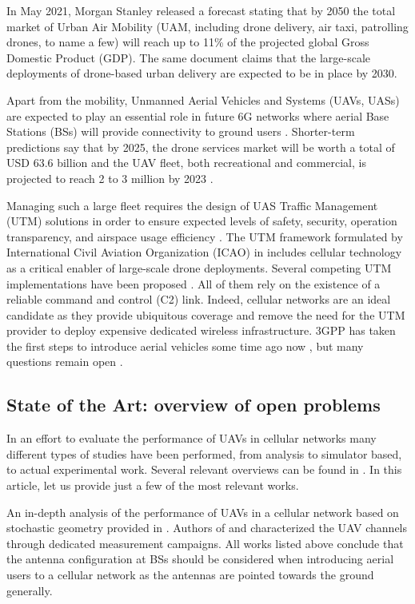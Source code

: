  In May 2021, Morgan Stanley released a forecast \cite{MS} stating that by 2050 the total market of Urban Air Mobility (UAM, including drone delivery, air taxi, patrolling drones, to name a few) will reach up to 11\% of the projected global Gross Domestic Product (GDP). The same document claims that the large-scale deployments of drone-based urban delivery are expected to be in place by 2030. 
 
Apart from the mobility, Unmanned Aerial Vehicles and Systems (UAVs, UASs) are expected to play an essential role in future 6G networks where aerial Base Stations (BSs) will provide connectivity to ground users \cite{Tut18, azari2021evolution, UAV_6G}. Shorter-term predictions say that by 2025, the drone services market will be worth a total of USD 63.6 billion \cite{business2021drone} and the UAV fleet, both recreational and commercial, is projected to reach 2 to 3 million by 2023 \cite{faa2019prediction}.

Managing such a large fleet requires the design of UAS Traffic Management (UTM) solutions in order to ensure expected levels of safety, security, operation transparency, and airspace usage efficiency \cite{Dr_Tech}. The UTM framework formulated by International Civil Aviation Organization (ICAO) in \cite{ICAO} includes cellular technology as a critical enabler of large-scale drone deployments. Several competing UTM implementations have been proposed \cite{Bauranov}. All of them rely on the existence of a reliable command and control (C2) link. Indeed, cellular networks are an ideal candidate as they provide ubiquitous coverage and remove the need for the UTM provider to deploy expensive dedicated wireless infrastructure. 3GPP has taken the first steps to introduce aerial vehicles some time ago now \cite{3gpp2018enhanced}, but many questions remain open \cite{Tut18, UAV_6G}.

\subsection{State of the Art: overview of open problems}
\par In an effort to evaluate the performance of UAVs in cellular networks many different types of studies have been performed, from analysis to simulator based, to actual experimental work. Several relevant overviews can be found in \cite{Tut18, azari2021evolution}. In this article, let us provide just a few of the most relevant works.  

An in-depth analysis of the performance of UAVs in a cellular network based on stochastic geometry provided in \cite{azari2019cellular}. Authors of \cite{rodriguez2021air} and \cite{bertold} characterized the UAV channels through dedicated measurement campaigns. All works listed above conclude that the antenna configuration at BSs should be considered when introducing aerial users to a cellular network as the antennas are pointed towards the ground generally. 

